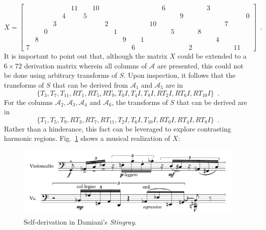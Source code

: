 \begin{example}
    \begin{equation}
        X = \left[
        \begin{array}{cccccccccccc|cccccccccccc}
            &&&&& 11 && 10 &&&&&&& 6 &&&&& 3 &&&& \\
            &&&& 4 && 5 &&&&&&&&&& 9 &&&&&&& 0 \\
            &&& 3 &&&&& 2 &&&&& 10 &&&&&&&& 7 && \\
            && 0 &&&&&&& 1 &&&&&& 5 &&& 8 &&&&& \\
            & 8 &&&&&&&&& 9 && 1 &&&&&&&& 4 &&& \\
            7 &&&&&&&&&&& 6 &&&&&& 2 &&&&& 11 &
        \end{array}
        \right] \enspace.
    \end{equation}
    It is important to point out that, although the matrix $X$ could be extended to a $6 \times 72$ derivation matrix wherein all columns of $\mathcal{A}$ are presented, this could not be done using arbitrary transforms of $S$. Upon inspection, it follows that the transforms of $S$ that can be derived from $\mathcal{A}_1$ and $\mathcal{A}_5$ are in
    \begin{equation}
        \{ T_3, T_7, T_{11}, RT_1, RT_5, RT_9, T_0I, T_4I, T_8I, RT_2I, RT_6I, RT_{10}I \} \enspace.
    \end{equation}
    For the columns $\mathcal{A}_2, \mathcal{A}_3, \mathcal{A}_4$ and $\mathcal{A}_6$, the transforms of $S$ that can be derived are in
    \begin{equation}
        \{ T_1, T_5, T_9, RT_3, RT_7, RT_{11}, T_2I, T_6I, T_{10}I, RT_0I, RT_4I, RT_8I \} \enspace.
    \end{equation}
    Rather than a hinderance, this fact can be leveraged to explore contrasting harmonic regions. Fig.~\ref{fig:stingray} shows a musical realization of $X$:
    \begin{figure}[htbp]
        \centering
        \includegraphics[width=6.5in]{figures/stingray-example.pdf}
        \caption[Self-derivation in Damiani's \emph{Stingray}.]{Self-derivation in Damiani's \emph{Stingray}.}
        \label{fig:stingray}
    \end{figure}
\end{example}

